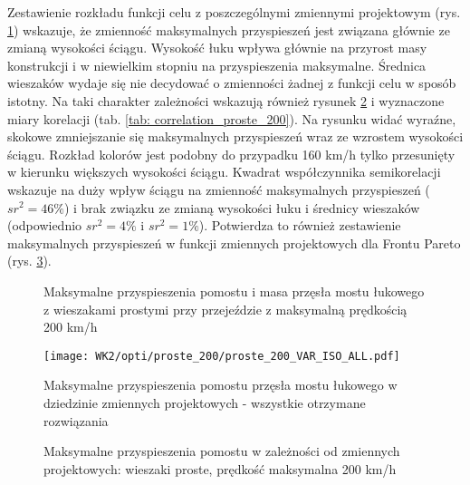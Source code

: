 Zestawienie rozkładu funkcji celu z poszczególnymi zmiennymi projektowym (rys. \ref{fig:wk2_opti_proste_200_variables}) wskazuje, że zmienność maksymalnych przyspieszeń jest związana głównie ze zmianą wysokości ściągu. Wysokość łuku wpływa głównie na przyrost masy konstrukcji i w niewielkim stopniu na przyspieszenia maksymalne. Średnica wieszaków wydaje się nie decydować o zmienności żadnej z funkcji celu w sposób istotny. Na taki charakter zależności wskazują również rysunek \ref{fig:wk2_opti_proste_200_vars_all} i wyznaczone miary korelacji (tab. \ref{tab: correlation_proste_200}). Na rysunku widać wyraźne, skokowe zmniejszanie się maksymalnych przyspieszeń wraz ze wzrostem wysokości ściągu. Rozkład kolorów jest podobny do przypadku 160 km/h tylko przesunięty w kierunku większych wysokości ściągu. Kwadrat współczynnika semikorelacji wskazuje na duży wpływ ściągu na zmienność maksymalnych przyspieszeń ($sr^2=46\%$) i brak związku ze zmianą wysokości łuku i średnicy wieszaków (odpowiednio $sr^2=4\%$ i $sr^2=1\%$). Potwierdza to również zestawienie maksymalnych przyspieszeń w funkcji zmiennych projektowych dla Frontu Pareto (rys. \ref{fig:wk2_opti_proste_200_var_2d}). 

\begin{figure}[hbt!]
	\centering
	\captionsetup{justification=centering}
	\caption{Maksymalne przyspieszenia pomostu i masa przęsła mostu łukowego z wieszakami prostymi przy przejeździe z maksymalną prędkością 200 km/h}
	\label{fig:wk2_opti_proste_200_variables}
\end{figure}

\begin{figure}[hbt!]
	\centering
	\texttt{[image: WK2/opti/proste\_200/proste\_200\_VAR\_ISO\_ALL.pdf]}
	\captionsetup{justification=centering}
	\caption{Maksymalne przyspieszenia pomostu przęsła mostu łukowego w dziedzinie zmiennych projektowych - wszystkie otrzymane rozwiązania}
	\label{fig:wk2_opti_proste_200_vars_all}
\end{figure}
\begin{figure}[hbt!]
	\centering
	\captionsetup{justification=centering}
	\caption{Maksymalne przyspieszenia pomostu w zależności od zmiennych projektowych: wieszaki proste, prędkość maksymalna 200 km/h}
	\label{fig:wk2_opti_proste_200_var_2d}
\end{figure}


